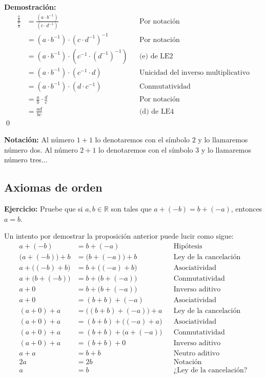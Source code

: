\documentclass[11pt]{article}
\newcommand{\R}{\mathbb{R}}
\begin{document}
\begin{enumerate}[label=\alph*)]
    \textbf{Demostración:}\begin{align*}
        \frac{\frac{a}{b}}{\frac{c}{d}} &= \frac{\left( a \cdot b^{-1} \right)}{\left( c \cdot d^{-1} \right)} && \text{Por notación}\\
        &= \left( a \cdot b^{-1} \right) \cdot \left( c \cdot d^{-1} \right)^{-1} && \text{Por notación}\\
        &= \left( a \cdot b^{-1} \right) \cdot \left( c^{-1} \cdot \left( d^{-1} \right) ^{-1} \right) && \text{(e) de LE2}\\
        &= \left( a \cdot b^{-1} \right) \cdot \left( c^{-1} \cdot d \right) && \text{Unicidad del inverso multiplicativo}\\
        &= \left( a \cdot b^{-1} \right) \cdot \left( d \cdot c^{-1} \right) && \text{Conmutatividad}\\
        &= \frac{a}{b} \cdot \frac{d}{c} && \text{Por notación}\\
        &= \frac{ad}{bc} && \text{(d) de LE4}
    \end{align*} \qed
    \end{enumerate}

\textbf{Notación:} Al número $1+1$ lo denotaremos con el símbolo $2$ y lo llamaremos número dos. Al número $2+1$ lo denotaremos con el símbolo $3$ y lo llamaremos número tres...

\pagebreak

\subsection*{Axiomas de orden}

\textbf{Ejercicio:} Pruebe que si $a,b\in \R$ son tales que $a+(-b)=b+(-a)$, entonces $a=b$.
    
Un intento por demostrar la proposición anterior puede lucir como sigue: \begin{align*}
a+(-b)&=b+(-a) && \text{Hipótesis} \\
\bigl(a+(-b)\bigr)+b&=\bigl(b+(-a)\bigr)+b&&\text{Ley de la cancelación} \\
a + \bigl((-b)+b\bigr)&= b+\bigl((-a)+b\bigr)&&\text{Asociatividad} \\
a + \bigl(b+(-b)\bigr)&= b+\bigl(b+(-a)\bigr)&&\text{Conmutatividad} \\
a + 0&= b+\bigl(b+(-a)\bigr)&&\text{Inverso aditivo} \\
a + 0&= (b+b)+(-a)&&\text{Asociatividad} \\
(a + 0) + a&= \bigl((b+b)+(-a)\bigr)+a&&\text{Ley de la cancelación} \\
(a + 0) + a&= (b+b)+\bigl((-a)+a\bigr)&&\text{Asociatividad} \\
(a + 0) + a&= (b+b)+\bigl(a+(-a)\bigr)&&\text{Conmutatividad} \\
(a + 0) + a&= (b+b)+0&&\text{Inverso aditivo} \\
a+ a&= b+b&&\text{Neutro aditivo} \\
2a &= 2b &&\text{Notación} \\
a &= b && \text{¿Ley de la cancelación?}
\end{align*}
\end{document}
